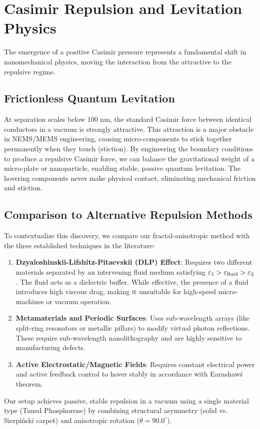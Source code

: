 \documentclass[12pt,letterpaper]{article}
\begin{document}
\section{Casimir Repulsion and Levitation Physics}
\label{sec:repulsion_physics}

The emergence of a positive Casimir pressure represents a fundamental shift in nanomechanical physics, moving the interaction from the attractive to the repulsive regime.

\subsection{Frictionless Quantum Levitation}
At separation scales below $100$ nm, the standard Casimir force between identical conductors in a vacuum is strongly attractive. This attraction is a major obstacle in NEMS/MEMS engineering, causing micro-components to stick together permanently when they touch (stiction). By engineering the boundary conditions to produce a repulsive Casimir force, we can balance the gravitational weight of a micro-plate or nanoparticle, enabling stable, passive quantum levitation. The hovering components never make physical contact, eliminating mechanical friction and stiction.

\subsection{Comparison to Alternative Repulsion Methods}
To contextualize this discovery, we compare our fractal-anisotropic method with the three established techniques in the literature:
\begin{enumerate}
    \item \textbf{Dzyaloshinskii-Lifshitz-Pitaevskii (DLP) Effect}: Requires two different materials separated by an intervening fluid medium satisfying $\varepsilon_1 > \varepsilon_{\rm fluid} > \varepsilon_2$. The fluid acts as a dielectric buffer. While effective, the presence of a fluid introduces high viscous drag, making it unsuitable for high-speed micro-machines or vacuum operation.
    \item \textbf{Metamaterials and Periodic Surfaces}: Uses sub-wavelength arrays (like split-ring resonators or metallic pillars) to modify virtual photon reflections. These require sub-wavelength nanolithography and are highly sensitive to manufacturing defects.
    \item \textbf{Active Electrostatic/Magnetic Fields}: Requires constant electrical power and active feedback control to hover stably in accordance with Earnshaw\'s theorem.
\end{enumerate}
Our setup achieves passive, stable repulsion in a vacuum using a single material type (Tuned Phosphorene) by combining structural asymmetry (solid vs. Sierpi\'nski carpet) and anisotropic rotation ($\theta = 90.0^\circ$).
\end{document}

